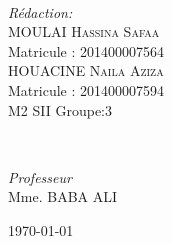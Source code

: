 \begin{titlepage}
	\HRule\\[1.5cm]
	
	
	\begin{minipage}{0.4\textwidth}
		\begin{flushleft}
			\large
			\textit{Rédaction:}\\
			MOULAI \textsc{Hassina Safaa}\\ %
			Matricule : 201400007564\\ 
			
			HOUACINE \textsc{Naila Aziza}\\ %
			Matricule : 201400007594\\ 
			
			M2 SII Groupe:3\\
			
		\end{flushleft}
	\end{minipage}
	~
	\begin{minipage}{0.4\textwidth}
		\begin{flushright}
			\large
			\textit{Professeur}\\
			Mme. BABA ALI  %
		\end{flushright}
	\end{minipage}
	
	
	\vfill\vfill\vfill %
	
	{\large\today} %
	
	
	\vfill %
	
\end{titlepage}